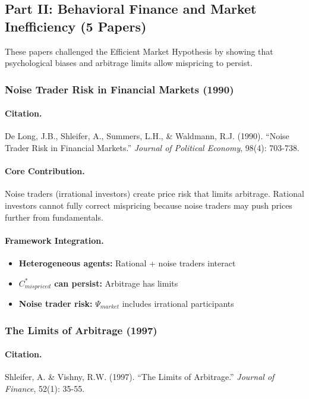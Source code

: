 \subsection{Part II: Behavioral Finance and Market Inefficiency (5 Papers)}

These papers challenged the Efficient Market Hypothesis by showing that
psychological biases and arbitrage limits allow mispricing to persist.

\subsubsection{Noise Trader Risk in Financial Markets (1990)}

\paragraph{Citation.}
De Long, J.B., Shleifer, A., Summers, L.H., \& Waldmann, R.J. (1990).
``Noise Trader Risk in Financial Markets.''
\emph{Journal of Political Economy}, 98(4): 703-738.

\paragraph{Core Contribution.}
Noise traders (irrational investors) create price risk that limits
arbitrage. Rational investors cannot fully correct mispricing because
noise traders may push prices further from fundamentals.

\paragraph{Framework Integration.}
\begin{itemize}
  \item \textbf{Heterogeneous agents:} Rational + noise traders interact
  \item \textbf{$C^*_{mispriced}$ can persist:} Arbitrage has limits
  \item \textbf{Noise trader risk:} $\Psi_{market}$ includes irrational participants
\end{itemize}

\subsubsection{The Limits of Arbitrage (1997)}

\paragraph{Citation.}
Shleifer, A. \& Vishny, R.W. (1997).
``The Limits of Arbitrage.'' \emph{Journal of Finance}, 52(1): 35-55.


